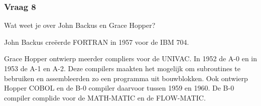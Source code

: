 \documentclass[../main.tex]{subfiles}
\begin{document}
\subsubsection{Vraag 8}
\begin{question}
Wat weet je over John Backus en Grace Hopper?
\end{question}
\begin{solution}
John Backus cre\"eerde FORTRAN in 1957 voor de IBM 704.

Grace Hopper ontwierp meerder compliers voor de UNIVAC.
In 1952 de A-0 en in 1953 de A-1 en A-2.
Deze compilers maakten het mogelijk om subroutines te bebruiken en assembleerden zo een programma uit bouwblokken.
Ook ontwierp Hopper COBOL en de B-0 compiler daarvoor tussen 1959 en 1960.
De B-0 compiler complide voor de MATH-MATIC en de FLOW-MATIC.
\end{solution}
\end{document}
